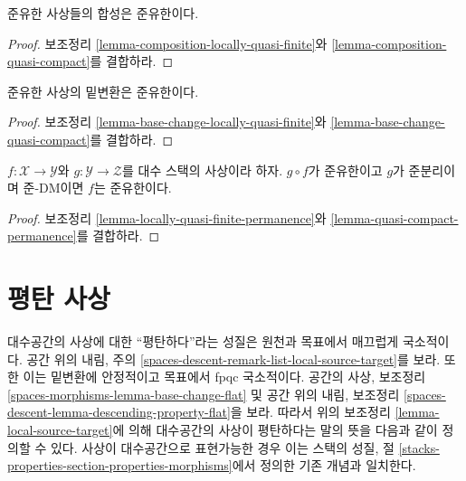 \begin{lemma}
\label{lemma-composition-quasi-finite}
준유한 사상들의 합성은 준유한이다.
\end{lemma}

\begin{proof}
보조정리 \ref{lemma-composition-locally-quasi-finite}와
\ref{lemma-composition-quasi-compact}를 결합하라.
\end{proof}

\begin{lemma}
\label{lemma-base-change-quasi-finite}
준유한 사상의 밑변환은 준유한이다.
\end{lemma}

\begin{proof}
보조정리 \ref{lemma-base-change-locally-quasi-finite}와
\ref{lemma-base-change-quasi-compact}를 결합하라.
\end{proof}

\begin{lemma}
\label{lemma-quasi-finite-permanence}
$f : \mathcal{X} \to \mathcal{Y}$와 $g : \mathcal{Y} \to \mathcal{Z}$를
대수 스택의 사상이라 하자. $g \circ f$가 준유한이고 $g$가 준분리이며
준-DM이면 $f$는 준유한이다.
\end{lemma}

\begin{proof}
보조정리 \ref{lemma-locally-quasi-finite-permanence}와
\ref{lemma-quasi-compact-permanence}를 결합하라.
\end{proof}












\section{평탄 사상}
\label{section-flat}

\noindent
대수공간의 사상에 대한 ``평탄하다''라는 성질은 원천과 목표에서
매끄럽게 국소적이다. 공간 위의 내림, 주의
\ref{spaces-descent-remark-list-local-source-target}를 보라.
또한 이는 밑변환에 안정적이고 목표에서 fpqc 국소적이다. 공간의 사상,
보조정리 \ref{spaces-morphisms-lemma-base-change-flat} 및 공간 위의 내림,
보조정리 \ref{spaces-descent-lemma-descending-property-flat}을 보라.
따라서 위의 보조정리 \ref{lemma-local-source-target}에 의해 대수공간의
사상이 평탄하다는 말의 뜻을 다음과 같이 정의할 수 있다.%
사상이 대수공간으로 표현가능한 경우 이는 스택의 성질, 절
\ref{stacks-properties-section-properties-morphisms}에서 정의한 기존
개념과 일치한다.

